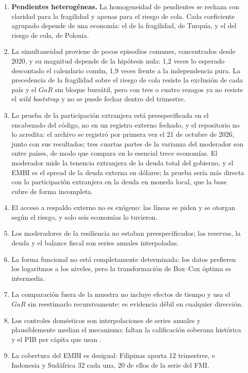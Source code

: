 \begin{enumerate}
\item \textbf{Pendientes heterogéneas.} La homogeneidad de pendientes se rechaza con claridad para la fragilidad y apenas para el riesgo de cola. Cada coeficiente agrupado depende de una economía: el de la fragilidad, de Turquía, y el del riesgo de cola, de Polonia.
\item La simultaneidad proviene de pocos episodios comunes, concentrados desde 2020, y su magnitud depende de la hipótesis nula: 1,2 veces lo esperado descontado el calendario común, 1,9 veces frente a la independencia pura. La precedencia de la fragilidad sobre el riesgo de cola resiste la exclusión de cada país y el $GaR$ sin bloque bursátil, pero con tres o cuatro rezagos ya no resiste el \textit{wild bootstrap} y no se puede fechar dentro del trimestre.
\item La prueba de la participación extranjera está preespecificada en el encabezado del código, no en un registro externo fechado, y el repositorio no lo acredita: el archivo se registró por primera vez el 21 de octubre de 2026, junto con sus resultados; tres cuartas partes de la varianza del moderador son entre países, de modo que compara en lo esencial trece economías. El moderador mide la tenencia extranjera de la deuda total del gobierno, y el EMBI es el spread de la deuda externa en dólares; la prueba sería más directa con la participación extranjera en la deuda en moneda local, que la base cubre de forma incompleta.
\item El acceso a respaldo externo no es exógeno: las líneas se piden y se otorgan según el riesgo, y solo seis economías lo tuvieron.
\item Los moderadores de la resiliencia no estaban preespecificados; las reservas, la deuda y el balance fiscal son series anuales interpoladas.
\item La forma funcional no está completamente determinada: los datos prefieren los logaritmos a los niveles, pero la transformación de Box--Cox óptima es intermedia.
\item La comparación fuera de la muestra no incluye efectos de tiempo y usa el $GaR$ sin reestimarlo recursivamente: es evidencia débil en cualquier dirección.
\item Los controles domésticos son interpolaciones de series anuales y plausiblemente median el mecanismo; faltan la calificación soberana histórica y el PIB per cápita que usan \citet{Chari2024b}.
\item La cobertura del EMBI es desigual: Filipinas aporta 12 trimestres, e Indonesia y Sudáfrica 32 cada una, 20 de ellos de la serie del FMI.
\end{enumerate}
